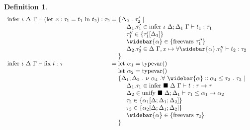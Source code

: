 \documentclass[manuscript]{acmart}
\theoremstyle{definition}
\newtheorem{definition}{Definition}[section]
\begin{document}
\begin{definition}
\[\begin{array}{l @{} l}
    \text{infer } \iota\ \Delta\ \Gamma \vdash 
    (\text{let}\ x : \tau_1 = t_1 \text{ in } t_2) : \tau_2
    &{} =
    \begin{array}[t]{@{} l}
      \{ \Delta_2\ .\ \tau_2' \ |\ 
      \\
      \ \ \ \ \Delta_1.\tau_1' \in \text{infer } \iota\ \Delta;\Delta_1\ \Gamma \vdash t_1 : \tau_1
      \\ 
      \ \ \ \ \tau_1'' \in \{\tau_1'[\Delta_1]\}
      \\ 
      \ \ \ \ \widebar{\alpha} \in \{\text{freevars}\ \tau_1''\}
      \\ 
      \ \ \ \ \Delta_2.\tau_2' \in \Delta\ \Gamma,x \mapsto \forall \widebar{\alpha} . \tau_1''
        \vdash t_2 : \tau_2 
      \\
      \} 
    \end{array}
    \\

    \text{infer } \iota\ \Delta\ \Gamma \vdash 
    \text{fix } t : \tau      
    &{} =
    \begin{array}[t]{@{} l}
      \text{let } \alpha_1 = \text{typevar}()
      \\
      \text{let } \alpha_2 = \text{typevar}()
      \\
      \{ \Delta_1;\Delta_2\ .\ \nu\ \alpha_4 \ . \forall\ \widebar{\alpha} ::
        \alpha_4 \leq \tau_2\ .\ \tau_3
        \ |\ 
      \\
      \ \ \ \ \Delta_1.\tau_1 \in
      \text{infer } \blacksquare\ \Delta\ \Gamma \vdash t : \tau \rightarrow \tau
      \\
      \ \ \ \ \Delta_2 \in \text{unify } \blacksquare\ \Delta;\Delta_1 \vdash 
      \tau_1 \leq \alpha_1 \rightarrow \alpha_2 
      \\
      \ \ \ \ \tau_2 \in \{\alpha_1[\Delta;\Delta_1;\Delta_2]\}
      \\ 
      \ \ \ \ \tau_3 \in \{\alpha_2[\Delta;\Delta_1;\Delta_2]\} 
      \\
      \ \ \ \ \widebar{\alpha} \in \{ \text{freevars}\ \tau_2 \}
      \\
      \} 
    \end{array}
  \end{array}
\]
\end{definition}

\end{document}
